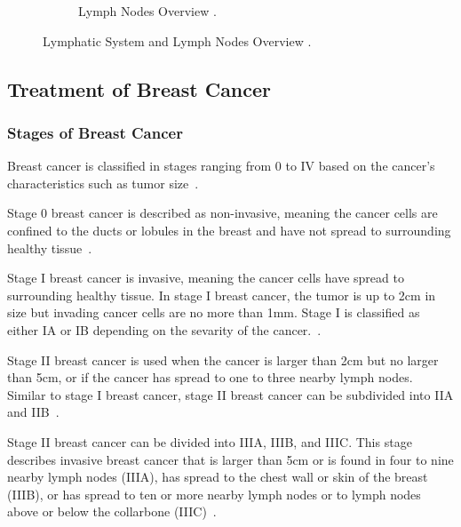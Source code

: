 \begin{figure}[h!]
\begin{minipage}{0.92\textwidth}
\begin{subfigure}[b]{0.45\textwidth}
                        \caption{Lymph Nodes Overview \cite{RefWorks:RefID:364-riggio2020lingering}.}
                        \label{fig:introduction:lymphatic_process_of_metastatic_breast_cancer}
                \end{subfigure}
        \end{minipage}
        \caption{Lymphatic System and Lymph Nodes Overview \cite{RefWorks:RefID:364-riggio2020lingering} \cite{RefWorks:RefID:37-memorialsurgery}.}
        \label{fig:introduction:lymphatic_system_and_nodes_overview}
\end{figure}

\subsection{Treatment of Breast Cancer\label{sec:introduction:treatmentofbreastcancer}}

\subsubsection{Stages of Breast Cancer\label{sec:introduction:breastcancer:stagesofbreastcancer}}
Breast cancer is classified in stages ranging from 0 to IV based on the cancer's characteristics such as tumor size~\cite{RefWorks:RefID:151-2025breast}.

Stage 0 breast cancer is described as non-invasive, meaning the cancer cells are confined to the ducts or lobules in the breast and have not spread to surrounding healthy tissue~\cite{RefWorks:RefID:151-2025breast}.

Stage I breast cancer is invasive, meaning the cancer cells have spread to surrounding healthy tissue. In stage I breast cancer, the tumor is up to 2cm in size but invading cancer cells are no more than 1mm. Stage I is classified as either IA or IB depending on the sevarity of the cancer.~\cite{RefWorks:RefID:151-2025breast}.

Stage II breast cancer is used when the cancer is larger than 2cm but no larger than 5cm, or if the cancer has spread to one to three nearby lymph nodes. Similar to stage I breast cancer, stage II breast cancer can be subdivided into IIA and IIB~\cite{RefWorks:RefID:151-2025breast}.

Stage II breast cancer can be divided into IIIA, IIIB, and IIIC. This stage describes invasive breast cancer that is larger than 5cm or is found in four to nine nearby lymph nodes (IIIA), has spread to the chest wall or skin of the breast (IIIB), or has spread to ten or more nearby lymph nodes or to lymph nodes above or below the collarbone (IIIC)~\cite{RefWorks:RefID:151-2025breast}.

